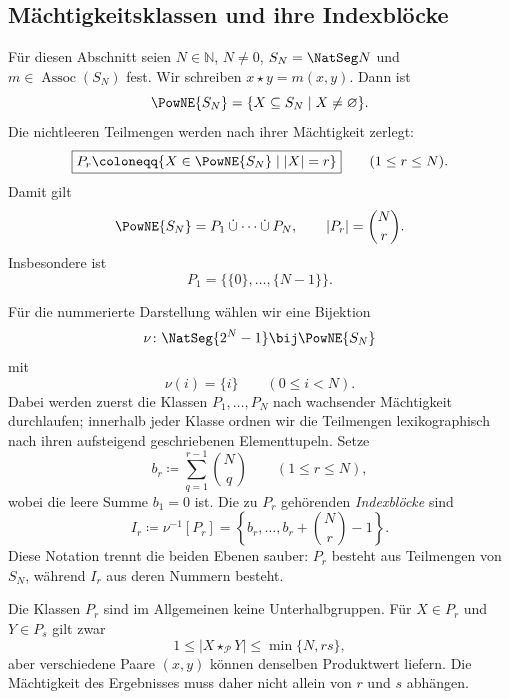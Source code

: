 \documentclass[main.tex]{subfiles}
\begin{document}
\subsection{Mächtigkeitsklassen und ihre Indexblöcke}

Für diesen Abschnitt seien \(N\in\mathbb N\), \(N\neq0\),
\(S_N=\NatSeg N\) und \(m\in\operatorname{Assoc}(S_N)\) fest.  Wir
schreiben \(x\star y=m(x,y)\).  Dann ist
\[
  \PowNE{S_N}
  =
  \{X\subseteq S_N\mid X\neq\varnothing\}.
\]
Die nichtleeren Teilmengen werden nach ihrer Mächtigkeit zerlegt:
\[
  \boxed{
  P_r
  \coloneqq
  \{X\in\PowNE{S_N}\mid |X|=r\}}
  \qquad(1\leq r\leq N).
\]
Damit gilt
\[
  \PowNE{S_N}
  =
  P_1\mathbin{\dot\cup}\cdots\mathbin{\dot\cup}P_N,
  \qquad
  |P_r|=\binom{N}{r}.
\]
Insbesondere ist
\[
  P_1=\bigl\{\{0\},\ldots,\{N-1\}\bigr\}.
\]

Für die nummerierte Darstellung wählen wir eine Bijektion
\[
  \nu\colon
  \NatSeg{2^N-1}
  \bij
  \PowNE{S_N}
\]
mit
\[
  \nu(i)=\{i\}
  \qquad(0\leq i<N).
\]
Dabei werden zuerst die Klassen \(P_1,\ldots,P_N\) nach wachsender
Mächtigkeit durchlaufen; innerhalb jeder Klasse ordnen wir die Teilmengen
lexikographisch nach ihren aufsteigend geschriebenen Elementtupeln.  Setze
\[
  b_r\coloneqq
  \sum_{q=1}^{r-1}\binom{N}{q}
  \qquad(1\leq r\leq N),
\]
wobei die leere Summe \(b_1=0\) ist.  Die zu \(P_r\) gehörenden
\emph{Indexblöcke} sind
\[
  \boxed{
  I_r
  \coloneqq
  \nu^{-1}[P_r]
  =
  \left\{
    b_r,\ldots,b_r+\binom{N}{r}-1
  \right\}.}
\]
Diese Notation trennt die beiden Ebenen sauber: \(P_r\) besteht aus
Teilmengen von \(S_N\), während \(I_r\) aus deren Nummern besteht.

Die Klassen \(P_r\) sind im Allgemeinen keine Unterhalbgruppen.  Für
\(X\in P_r\) und \(Y\in P_s\) gilt zwar
\[
  1\leq|X\star_{\mathcal P}Y|
  \leq\min\{N,rs\},
\]
aber verschiedene Paare \((x,y)\) können denselben Produktwert liefern.  Die
Mächtigkeit des Ergebnisses muss daher nicht allein von \(r\) und \(s\)
abhängen.
\end{document}
